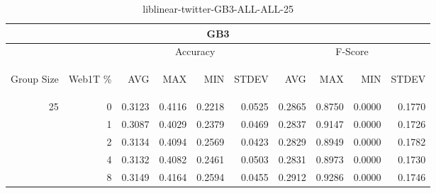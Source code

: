 \begin{center}
\begin{table}[htbp]
\begin{tabular}{ | r | r | r | r | r | r | r | r | r | r |}
\hline
\multicolumn{10}{|c|}{GB3}\\
\hline
 & & \multicolumn{4}{|c|}{Accuracy} & \multicolumn{4}{|c|}{F-Score}\\ \cline{3-10}
\begin{sideways}Group Size\end{sideways} & \begin{sideways}Web1T \%\end{sideways} & \begin{sideways}AVG\end{sideways} & \begin{sideways}MAX\end{sideways} & \begin{sideways}MIN\end{sideways} & \begin{sideways}STDEV\end{sideways} & \begin{sideways}AVG\end{sideways} & \begin{sideways}MAX\end{sideways} & \begin{sideways}MIN\end{sideways} & \begin{sideways}STDEV\end{sideways}\\
\hline
\multirow{5}{*}{25}
 & 0 & 0.3123 & 0.4116 & 0.2218 & 0.0525 & 0.2865 & 0.8750 & 0.0000 & 0.1770\\ \cline{2-10}
 & 1 & 0.3087 & 0.4029 & 0.2379 & 0.0469 & 0.2837 & 0.9147 & 0.0000 & 0.1726\\ \cline{2-10}
 & 2 & 0.3134 & 0.4094 & 0.2569 & 0.0423 & 0.2829 & 0.8949 & 0.0000 & 0.1782\\ \cline{2-10}
 & 4 & 0.3132 & 0.4082 & 0.2461 & 0.0503 & 0.2831 & 0.8973 & 0.0000 & 0.1730\\ \cline{2-10}
 & 8 & 0.3149 & 0.4164 & 0.2594 & 0.0455 & 0.2912 & 0.9286 & 0.0000 & 0.1746\\ \cline{2-10}
\hline
\end{tabular}
\caption{liblinear-twitter-GB3-ALL-ALL-25}
\end{table}
\end{center}

